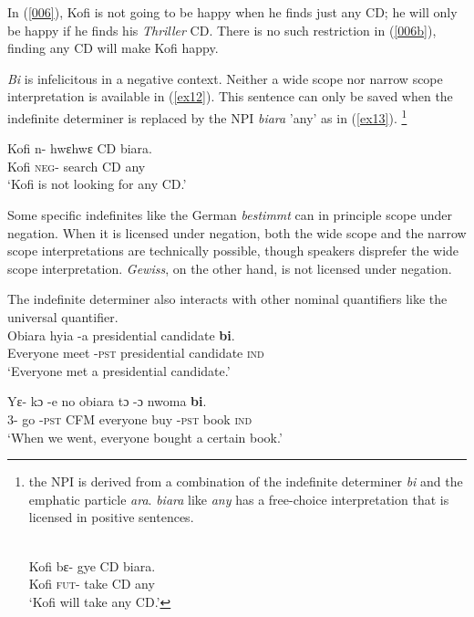 \documentclass[output=paper,modfonts]{langsci/langscibook}
\begin{document}
In (\ref{006}), Kofi is not going to be happy when he finds just any CD; he will only be happy if he finds his \emph{Thriller} CD. There is no such restriction in (\ref{006b}), finding any CD will make Kofi happy.

\emph{Bi} is infelicitous in a negative context. Neither a wide scope nor narrow scope interpretation is available in (\ref{ex12}). This sentence can only be saved when the indefinite determiner is replaced by the NPI \emph{biara} 'any' as in (\ref{ex13}). \footnote{the NPI is derived from a combination of the indefinite determiner \emph{bi} and the emphatic particle \emph{ara}. \emph{biara} like \emph{any} has a free-choice interpretation that is licensed in positive sentences.

\ea
{}\\
\label{ex120}
\gll  Kofi  bε- gye CD biara.\\
Kofi \textsc{fut}-  take CD any \\
\glt `Kofi will take any CD.'
\z 
}  
\ea
{}\\


\ex\label{ex13}
\gll  Kofi n- hwεhwε CD biara.\\
Kofi \textsc{neg}-  search CD any \\
\glt `Kofi is not looking for any CD.'
\z \z 

Some specific indefinites like the German \emph{bestimmt} can in principle scope under negation. When it is licensed under negation, both the wide scope and the narrow scope interpretations are technically possible, though speakers disprefer the wide scope interpretation. \emph{Gewiss}, on the other hand, is not licensed under negation.

The indefinite determiner also interacts with other nominal quantifiers like the universal quantifier. 
\ea 
{}\\
  \ea\label{ex100}
\gll Obiara hyia -a presidential candidate  \textbf{bi}. \\
    Everyone meet -\textsc{pst} presidential candidate \textsc{ind} \\
\glt `Everyone met a presidential candidate.'

\ex\label{ex15}
\gll  Yε- kɔ -e no obiara tɔ -ɔ  nwoma \textbf{bi}.\\
3{\pl}- go -\textsc{pst}  CFM everyone buy -\textsc{pst} book \textsc{ind} \\
\glt `When we went, everyone bought a certain book.'
\z \z
 
\end{document}
